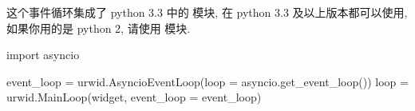 \subsubsection[AsyncioEventLoop]{}
这个事件循环集成了 python 3.3 中的  模块,  在 python 3.3 及以上版本都可以使用, 如果你用的是 python 2, 请使用  模块.

\begin{codebox}[
  caption = 利用 \inlinepython{AsyncioEventLoop} 初始化 \inlinepython{MainLoop}
]
import asyncio

event_loop = urwid.AsyncioEventLoop(loop = asyncio.get_event_loop())
loop = urwid.MainLoop(widget, event_loop = event_loop)
\end{codebox}
